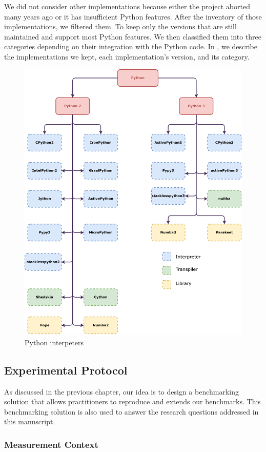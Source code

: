We did not consider other implementations because either the project aborted many years ago or it has insufficient Python features.
After the inventory of those implementations, we filtered them.
To keep only the versions that are still maintained and support most Python features.
We then classified them into three categories depending on their integration with the Python code.
In , we describe the implementations we kept, each implementation's version, and its category.

\begin{figure}
      \centering
      \includegraphics[width=.7\linewidth]{imgs/python-implementations-tree}
      \caption{Python interpeters}
      \label{fig:interpreters}
\end{figure}



\subsection{Experimental Protocol}
As discussed in the previous chapter, our idea is to design a benchmarking solution that allows practitioners to reproduce and extends our benchmarks.
This benchmarking solution is also used to answer the research questions addressed in this manuscript.


\subsubsection{Measurement Context}
